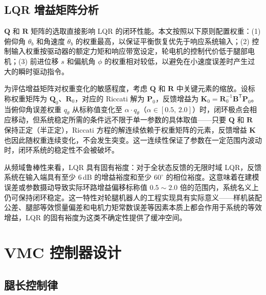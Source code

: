\subsection{LQR 增益矩阵分析}

$\boldsymbol{Q}$ 和 $\boldsymbol{R}$ 矩阵的选取直接影响 LQR 的闭环性能。本文按照以下原则配置权重：(1) 俯仰角 $\theta_b$ 和角速度 $\dot{\theta}_b$ 的权重最高，以保证平衡恢复优先于响应系统输入；(2) 控制输入权重按驱动器的额定力矩和响应带宽设定，轮电机的控制代价低于腿部电机；(3) 前进位移 $s$ 和偏航角 $\phi$ 的权重相对较低，以避免在小速度误差时产生过大的瞬时驱动指令。

为评估增益矩阵对权重变化的敏感程度，考虑 $\boldsymbol{Q}$ 和 $\boldsymbol{R}$ 中关键元素的缩放。设标称权重矩阵为 $\boldsymbol{Q}_0$、$\boldsymbol{R}_0$，对应的 Riccati 解为 $\boldsymbol{P}_0$，反馈增益为 $\boldsymbol{K}_0 = \boldsymbol{R}_0^{-1}\boldsymbol{B}^{\mathsf{T}}\boldsymbol{P}_0$。当俯仰角误差权重 $q_\theta$ 从标称值变化至 $\alpha \cdot q_\theta$（$\alpha \in [0.5,\,2.0]$）时，闭环极点会相应移动，但系统稳定所需的条件远不限于单一参数的具体取值——只要 $\boldsymbol{Q}$ 和 $\boldsymbol{R}$ 保持正定（半正定），Riccati 方程的解连续依赖于权重矩阵的元素，反馈增益 $\boldsymbol{K}$ 也因此随权重连续变化，不会发生突变。这一连续性保证了参数在一定范围内波动时，闭环系统的稳定性不会被破坏。

从频域鲁棒性来看，LQR 具有固有裕度：对于全状态反馈的无限时域 LQR，反馈系统在输入端具有至少 6\,dB 的增益裕度和至少 $60^\circ$ 的相位裕度\cite{kalman1960new}。这意味着在建模误差或参数摄动导致实际环路增益偏移标称值 $0.5\sim2.0$ 倍的范围内，系统名义上仍可保持闭环稳定。这一特性对轮腿机器人的工程实现具有实际意义——样机装配公差、腿部等效惯量偏差和电机力矩常数误差等因素本质上都会作用于系统的等效增益，LQR 的固有裕度为这类不确定性提供了缓冲空间。

\section{VMC 控制器设计}

\subsection{腿长控制律}

